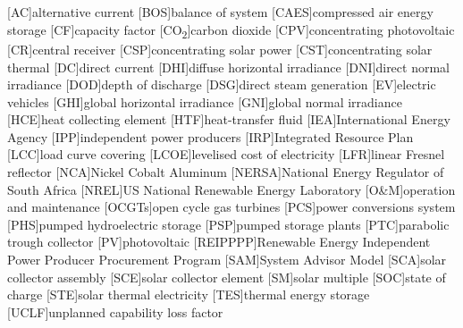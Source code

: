 {}
\chapter*{\listacroname}
\begin{acronym}[XXXXX]
  	[AC]{alternative current}
  	[BOS]{balance of system}
  	[CAES]{compressed air energy storage}
  	[CF]{capacity factor}
  	[CO\textsubscript{2}]{carbon dioxide}
    [CPV]{concentrating photovoltaic}
    [CR]{central receiver}
    [CSP]{concentrating solar power}
    [CST]{concentrating solar thermal} 
    [DC]{direct current}
    [DHI]{diffuse horizontal irradiance}
    [DNI]{direct normal irradiance}
	[DOD]{depth of discharge}
    [DSG]{direct steam generation}
    [EV]{electric vehicles}
    [GHI]{global horizontal irradiance}
    [GNI]{global normal irradiance}
    [HCE]{heat collecting element}
    [HTF]{heat-transfer fluid} 
    [IEA]{International Energy Agency}
    [IPP]{independent power producers}
    [IRP]{Integrated Resource Plan}
    [LCC]{load curve covering}
    [LCOE]{levelised cost of electricity}
    [LFR]{linear Fresnel reflector}
    [NCA]{Nickel Cobalt Aluminum}
    [NERSA]{National Energy Regulator of South Africa}
    [NREL]{US National Renewable Energy Laboratory}
    [O\&M]{operation and maintenance}
    [OCGTs]{open cycle gas turbines}
    [PCS]{power conversions system}
    [PHS]{pumped hydroelectric storage}
    [PSP]{pumped storage plants}
    [PTC]{parabolic trough collector}
    [PV]{photovoltaic}
    [REIPPPP]{Renewable Energy Independent Power Producer Procurement Program}
    [SAM]{System Advisor Model}
    [SCA]{solar collector assembly}
    [SCE]{solar collector element}
    [SM]{solar multiple}
    [SOC]{state of charge}
    [STE]{solar thermal electricity}
    [TES]{thermal energy storage}
    [UCLF]{unplanned capability loss factor}
\end{acronym}
